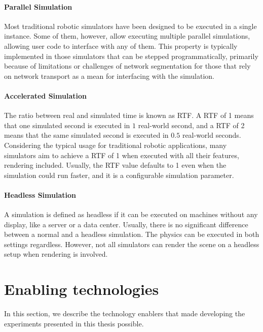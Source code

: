 \paragraph{Parallel Simulation}

Most traditional robotic simulators have been designed to be executed in a single instance.
Some of them, however, allow executing multiple parallel simulations, allowing user code to interface with any of them.
This property is typically implemented in those simulators that can be stepped programmatically, primarily because of limitations or challenges of network segmentation for those that rely on network transport as a mean for interfacing with the simulation.

\paragraph{Accelerated Simulation}

The ratio between real and simulated time is known as \ac{RTF}.
A \ac{RTF} of 1 means that one simulated second is executed in $1$ real-world second, and a \ac{RTF} of 2 means that the same simulated second is executed in $0.5$ real-world seconds.
Considering the typical usage for traditional robotic applications, many simulators aim to achieve a \ac{RTF} of 1 when executed with all their features, rendering included.
Usually, the \ac{RTF} value defaults to 1 even when the simulation could run faster, and it is a configurable simulation parameter.

\paragraph{Headless Simulation}

A simulation is defined as headless if it can be executed on machines without any display, like a server or a data center.
Usually, there is no significant difference between a normal and a headless simulation.
The physics can be executed in both settings regardless.
However, not all simulators can render the scene on a headless setup when rendering is involved.

\pagebreak
\section{Enabling technologies}

In this section, we describe the technology enablers that made developing the experiments presented in this thesis possible.

